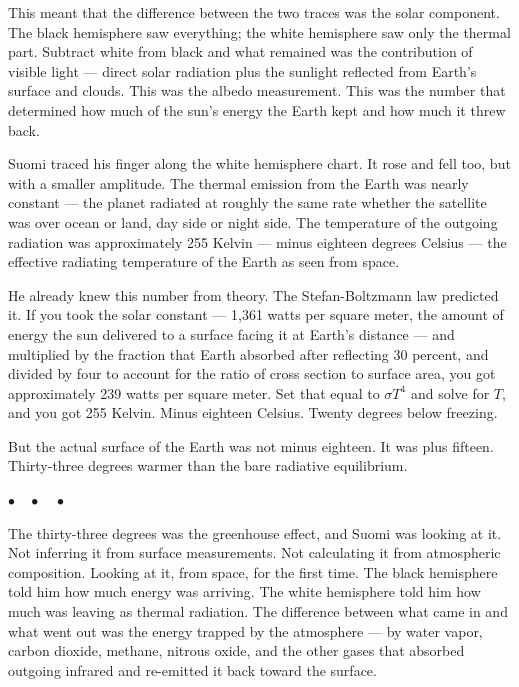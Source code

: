 \documentclass[12pt, letterpaper]{article}
\begin{document}
This meant that the difference between the two traces was the solar component. The black hemisphere saw everything; the white hemisphere saw only the thermal part. Subtract white from black and what remained was the contribution of visible light --- direct solar radiation plus the sunlight reflected from Earth's surface and clouds. This was the albedo measurement. This was the number that determined how much of the sun's energy the Earth kept and how much it threw back.

Suomi traced his finger along the white hemisphere chart. It rose and fell too, but with a smaller amplitude. The thermal emission from the Earth was nearly constant --- the planet radiated at roughly the same rate whether the satellite was over ocean or land, day side or night side. The temperature of the outgoing radiation was approximately 255 Kelvin --- minus eighteen degrees Celsius --- the effective radiating temperature of the Earth as seen from space.

He already knew this number from theory. The Stefan-Boltzmann law predicted it. If you took the solar constant --- 1,361 watts per square meter, the amount of energy the sun delivered to a surface facing it at Earth's distance --- and multiplied by the fraction that Earth absorbed after reflecting 30 percent, and divided by four to account for the ratio of cross section to surface area, you got approximately 239 watts per square meter. Set that equal to $\sigma T^4$ and solve for $T$, and you got 255 Kelvin. Minus eighteen Celsius. Twenty degrees below freezing.

But the actual surface of the Earth was not minus eighteen. It was plus fifteen. Thirty-three degrees warmer than the bare radiative equilibrium.

\begin{center}
$\bullet\quad\bullet\quad\bullet$
\end{center}

The thirty-three degrees was the greenhouse effect, and Suomi was looking at it. Not inferring it from surface measurements. Not calculating it from atmospheric composition. Looking at it, from space, for the first time. The black hemisphere told him how much energy was arriving. The white hemisphere told him how much was leaving as thermal radiation. The difference between what came in and what went out was the energy trapped by the atmosphere --- by water vapor, carbon dioxide, methane, nitrous oxide, and the other gases that absorbed outgoing infrared and re-emitted it back toward the surface.
\end{document}
